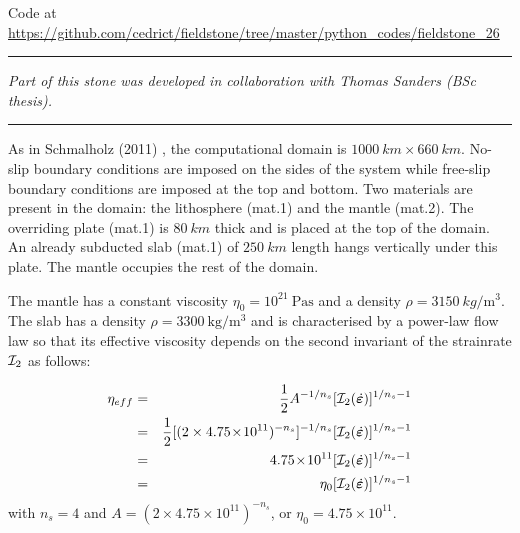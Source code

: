 

\begin{center}
Code at \url{https://github.com/cedrict/fieldstone/tree/master/python_codes/fieldstone_26}
\end{center}


\par\noindent\rule{\textwidth}{0.4pt}

{\sl Part of this stone was developed in collaboration with Thomas Sanders (BSc thesis).} 

\par\noindent\rule{\textwidth}{0.4pt}




As in Schmalholz (2011) \cite{schm11}, the computational domain is $1000~\si{km} \times 660~\si{km}$.
No-slip boundary conditions are imposed on the sides of the system while free-slip
boundary conditions are imposed at the top and bottom.
Two materials are present in the domain: the lithosphere (mat.1) and the mantle (mat.2). 
The overriding plate (mat.1) is $80~\si{km}$ thick and is placed at the top of the domain. 
An already subducted slab (mat.1) of $250~\si{km}$ length hangs vertically under this plate.
The mantle occupies the rest of the domain.

The mantle has a constant viscosity $\eta_0=10^{21}~\si{\pascal\second}$ 
and a density $\rho=3150~\si{kg\per\cubic\metre}$. 
The slab has a density $\rho=3300~\si{\kg\per\cubic\metre}$ 
and is characterised by a power-law flow law so that 
its effective viscosity depends on the second invariant of the strainrate 
${\cal I}_2$ as follows:

\begin{eqnarray}
\eta_{eff}
&=&\frac{1}{2} A^{-1/n_s} [{\cal I}_2(\dot{\bm \varepsilon})]^{1/n_s-1}  \\
&=&\frac{1}{2} [(2 \times 4.75\!\times\! 10^{11})^{-n_s}]^{-1/n_s} [{\cal I}_2(\dot{\bm \varepsilon})]   ^{1/n_s-1} \\
&=&4.75\!\times\! 10^{11} [{\cal I}_2(\dot{\bm \varepsilon})]^{1/n_s-1}  \\
&=& \eta_0 [{\cal I}_2(\dot{\bm \varepsilon})]^{1/n_s-1} 
\end{eqnarray}
with 
$n_s=4$ and $A=(2 \times 4.75\!\times\! 10^{11})^{-n_s}$, or $\eta_0=4.75\times 10^{11}$.


